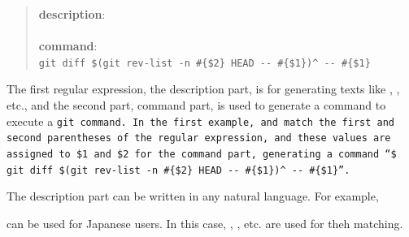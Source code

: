 \documentclass{sigchi}
\begin{document}
\begin{quote}
  \textbf{description}: \\
  \\
  \textbf{command}: \\
  {\fontsize{9pt}{0pt}\selectfont\verb|git diff $(git rev-list -n #{$2} HEAD -- #{$1})^ -- #{$1}|}
\end{quote}

The first regular expression, the description part,
is for generating texts like
, 
, etc.,
and the second part, command part,
is used to generate a command to execute a \tt{git} command.
In the first example,  and 
match the first and second parentheses of the regular expression, and
these values are assigned to \tt{\$1} and \tt{\$2}
for the command part, generating a command
``{\fontsize{9pt}{0pt}\selectfont\verb|$ git diff $(git rev-list -n #{$2} HEAD -- #{$1})^ -- #{$1}|}''.

The description part can be written in any natural language.
For example,

\begin{quote}
\end{quote}
  
can be used for Japanese users.
In this case,
,
, etc.
are used for theh matching.

% 
%
\end{document}
